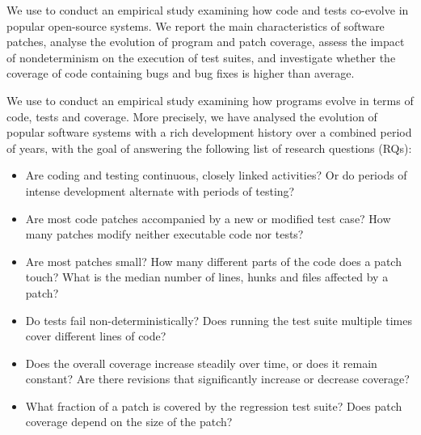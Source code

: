 We use \covrig to conduct an empirical study examining how code and
tests co-evolve in \numSystems popular open-source systems.  We
report the main characteristics of software patches, analyse the
evolution of program and patch coverage, assess the impact of
nondeterminism on the execution of test suites, and investigate
whether the coverage of code containing bugs and bug fixes is higher
than average.

We use \covrig to conduct an empirical study examining how programs
evolve in terms of code, tests and coverage.  More precisely, we have
analysed the evolution of \numSystems popular software systems with a
rich development history over a combined period of \numYears years,
with the goal of answering the following list of research questions
(RQs):

\begin{itemize}
\item[\textssc{RQ1}] \textit{\rqone}
            Are coding and testing continuous, closely linked
            activities?  Or do periods of intense development
            alternate with periods of testing?

\item[\textssc{RQ2}] \textit{\rqtwo}
            Are most code
            patches accompanied by a new or modified test case?  How
            many patches modify neither executable code nor tests?
           
\item[\textssc{RQ3}] \textit{\rqthree}
            Are most patches small?  
            How many different parts of the code does a patch touch?
            What is the median number of lines, hunks and
            files affected by a patch?

\item[\textssc{RQ4}] \textit{\rqfour}  Do tests fail non-deterministically?
            Does running the test suite multiple times cover different
            lines of code?

\item[\textssc{RQ5}] \textit{\rqfive}
            Does the overall coverage increase steadily over time, or
            does it remain constant?  Are there revisions that
            significantly increase or decrease coverage?

\item[\textssc{RQ6}] \textit{\rqsix}
            What fraction of a patch is covered by the regression test
            suite?  Does patch coverage depend on the size of the
            patch?


\end{itemize}
